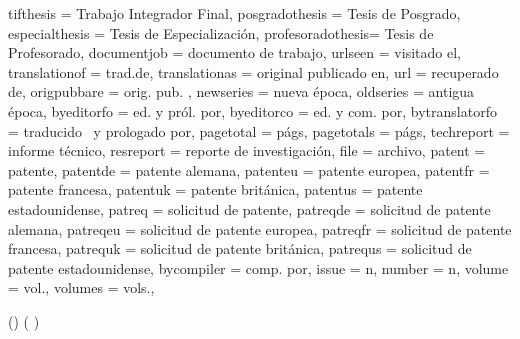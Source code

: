 {	tifthesis        = {Trabajo Integrador Final},
	posgradothesis   = {Tesis de Posgrado},
	especialthesis   = {Tesis de Especialización},
	profesoradothesis= {Tesis de Profesorado},
	documentjob      = {documento de trabajo},
	urlseen          = {visitado el\addspace},
	translationof    = {trad\adddot\addspace de},
	translationas    = {original publicado en},
	url              = {recuperado de},
	origpubbare      = {orig\adddotspace pub\adddotspace},
	newseries        = {nueva época},
	oldseries        = {antigua época},
	byeditorfo       = {ed\adddotspace y pról\adddotspace por},
	byeditorco       = {ed\adddotspace y com\adddotspace por},
	bytranslatorfo   = {traducido \lbx@lfromlang\ y prologado por},
	pagetotal        = {págs},
	pagetotals       = {págs},
	techreport       = {informe técnico},
	resreport        = {reporte de investigación},
	file             = {archivo},
	patent           = {patente},
	patentde         = {patente alemana},
	patenteu         = {patente europea},
	patentfr         = {patente francesa},
	patentuk         = {patente británica},
	patentus         = {patente estadounidense},
	patreq           = {solicitud de patente},
	patreqde         = {solicitud de patente alemana},
	patreqeu         = {solicitud de patente europea},
	patreqfr         = {solicitud de patente francesa},
	patrequk         = {solicitud de patente británica},
	patrequs         = {solicitud de patente estadounidense},
	bycompiler       = {comp\adddotspace por},
	issue            = {n},
	number           = {n},
	volume           = {vol\adddot},
	volumes          = {vols\adddot},
}

\makeatletter
{}
\makeatother

\DeclareCiteCommand{\titleyear}
{}
{%
}
{\multicitedelim}
{}

\DeclareCiteCommand{\citeyearpar}
{}
{%
	{(\bibhyperref{\printdate})}
	{%
		{(\bibhyperref{\printdate}}
		{%
			\ifnumequal{\value{citecount}}{\value{citetotal}}
			{\addcomma\addspace\bibhyperref{\printdate})}
			{\addcomma\addspace\bibhyperref{\printdate}}%
		}%
	}%
}
{}
{}
